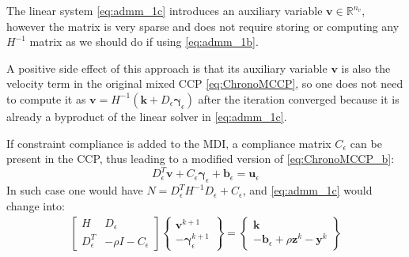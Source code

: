 \documentclass[AMA,STIX1COL]{WileyNJD-v2}
\newcommand{\vect}[1]{\bm{#1}}
\begin{document}
\begin{corollary}
The linear system \eqref{eq:admm_1c} introduces an auxiliary variable $\vect{v} \in \mathbb{R}^{n_v}$, however the matrix is very sparse and does not require storing or computing any $H^{-1}$ matrix as we should do if using \eqref{eq:admm_1b}.
\end{corollary}

\begin{corollary}
A positive side effect of this approach is that its auxiliary variable $\vect{v}$ is also the velocity term in the original mixed CCP 
\eqref{eq:ChronoMCCP}, so one does not need to compute it as $\vect{v}=H^{-1}(\vect{k} + D_\epsilon \vect{\gamma}_\epsilon )$ after the iteration converged because it is already a byproduct of the linear solver in \eqref{eq:admm_1c}.
\end{corollary}

\begin{corollary}
If constraint compliance is added to the MDI, a compliance matrix $C_\epsilon$ can be present in the CCP, thus leading to a modified version of \eqref{eq:ChronoMCCP_b}:
\[
D_{\epsilon}^T \vect{v}  +C_\epsilon \vect{\gamma}_\epsilon + \vect{b}_\epsilon = \vect{u}_\epsilon
\]
In such case one would have $N=D_{\epsilon}^T H^{-1} D_{\epsilon} + C_\epsilon$, and \eqref{eq:admm_1c} would change into: 
\begin{subequations}
	\begin{align}
    \begin{bmatrix}
		 H   & D_\epsilon \\
		 D_\epsilon^T & - \rho I - C_\epsilon
		\end{bmatrix}
		\begin{Bmatrix}
		 \vect{v}^{k+1}   \\
		 -\vect{\gamma}_\epsilon^{k+1} 
		\end{Bmatrix}
		=
		\begin{Bmatrix}
		 \vect{k} \\
		 -\vect{b}_\epsilon + \rho \vect{z}^k -\vect{y}^k 
		\end{Bmatrix}
	\end{align}
	\label{eq:admm_1c_compl}
\end{subequations}
\end{corollary}
\end{document}
